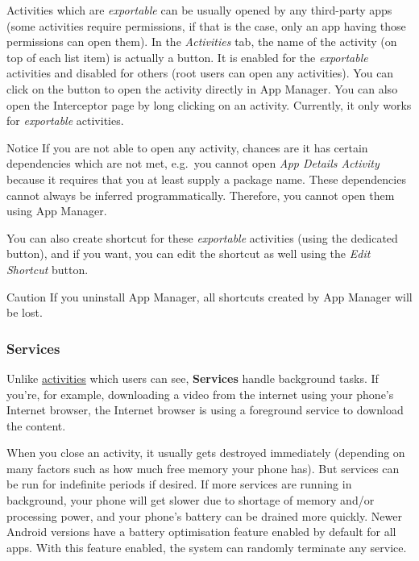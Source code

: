Activities which are \textit{exportable} can be usually opened by any third-party apps (some activities require
permissions, if that is the case, only an app having those permissions can open them). In the \textit{Activities} tab,
the name of the activity (on top of each list item) is actually a button. It is enabled for the \textit{exportable}
activities and disabled for others (root users can open any activities). You can click on the button to open the
activity directly in App Manager. You can also open the Interceptor page by long clicking on an activity. Currently, it
only works for \textit{exportable} activities.

\begin{warning}{Notice}
    If you are not able to open any activity, chances are it has certain dependencies which are not met, e.g.\ you
    cannot open  \textit{App Details Activity} because it requires that you at least supply a package name. These
    dependencies cannot always be inferred programmatically. Therefore, you cannot open them using App Manager.
\end{warning}

You can also create shortcut for these \textit{exportable} activities (using the dedicated button), and if you want, you
can edit the shortcut as well using the \textit{Edit Shortcut} button.

\begin{danger}{Caution}
    If you uninstall App Manager, all shortcuts created by App Manager will be lost.
\end{danger}

\subsubsection{Services}\label{subsubsec:details:servcies} %
Unlike \hyperref[subsubsec:activities]{activities} which users can see, \textbf{Services} handle background tasks. If
you're, for example, downloading a video from the internet using your phone's Internet browser, the Internet browser is
using a foreground service to download the content.

When you close an activity, it usually gets destroyed immediately (depending on many factors such as how much free
memory your phone has). But services can be run for indefinite periods if desired. If more services are running in
background, your phone will get slower due to shortage of memory and/or processing power, and your phone's battery can
be drained more quickly. Newer Android versions have a battery optimisation feature enabled by default for all apps.
With this feature enabled, the system can randomly terminate any service.


